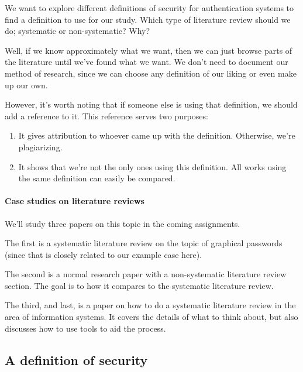 \begin{frame}
  \begin{exercise}
    We want to explore different definitions of security for authentication 
    systems to find a definition to use for our study.
    Which type of literature review should we do; systematic or non-systematic?
    Why?
  \end{exercise}
\end{frame}

Well, if we know approximately what we want, then we can just browse parts of 
the literature until we've found what we want.
We don't need to document our method of research, since we can choose any 
definition of our liking or even make up our own.

However, it's worth noting that if someone else is using that definition, we 
should add a reference to it.
This reference serves two purposes:
\begin{enumerate}
  \item It gives attribution to whoever came up with the definition.
    Otherwise, we're plagiarizing.
  \item It shows that we're not the only ones using this definition.
    All works using the same definition can easily be compared.
\end{enumerate}

\paragraph{Case studies on literature reviews}

We'll study three papers on this topic in the coming assignments.

The first\autocite{GraphicalPasswordsSurvey} is a systematic literature review 
on the topic of graphical passwords (since that is closely related to our 
example case here).

The second\autocite{OfPasswordsAndPeople} is a normal research paper with a 
non-systematic literature review section.
The goal is to how it compares to the systematic literature review.

The third, and last, is a paper on how to do a systematic literature review in 
the area of information systems\autocite{SLRinIS}.
It covers the details of what to think about, but also discusses how to use 
tools to aid the process.

\subsection{A definition of security}

